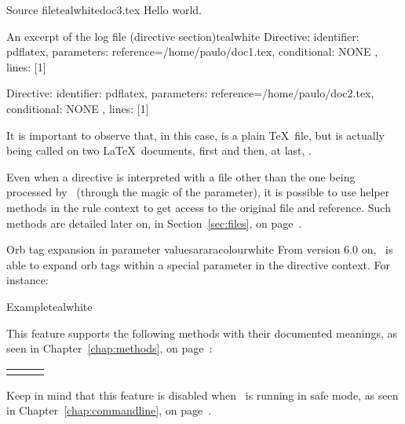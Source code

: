 \begin{ncodebox}{Source file}{teal}{\icnote}{white}{doc3.tex}
Hello world.
\bye
\end{ncodebox}

\begin{codebox}{An excerpt of the log file (directive section)}{teal}{\icnote}{white}
Directive: { identifier: pdflatex, parameters:
{reference=/home/paulo/doc1.tex},
conditional: { NONE }, lines: [1] }

Directive: { identifier: pdflatex, parameters:
{reference=/home/paulo/doc2.tex},
conditional: { NONE }, lines: [1] }
\end{codebox}

It is important to observe that, in this case,  is a plain \TeX\ file, but  is actually being called on two \LaTeX\ documents, first  and then, at last, .

Even when a directive is interpreted with a file other than the one being processed by \arara\ (through the magic of the  parameter), it is possible to use helper methods in the rule context to get access to the original file and reference. Such methods are detailed later on, in Section~\ref{sec:files}, on page~\pageref{sec:files}.

\begin{messagebox}{Orb tag expansion in parameter values}{araracolour}{\icinfo}{white}
From version 6.0 on, \arara\ is able to expand orb tags within a special  parameter in the directive context. For instance:

\begin{codebox}{Example}{teal}{\icnote}{white}
\end{codebox}

This feature supports the following methods with their documented meanings, as seen in Chapter~\ref{chap:methods}, on page~\pageref{chap:methods}:

\vspace{2ex}

\begin{tabularx}{0.95\textwidth}{YYY}
 &  & 
\end{tabularx}

\vspace{2ex}

Keep in mind that this feature is disabled when \arara\ is running in safe mode, as seen in Chapter~\ref{chap:commandline}, on page~\pageref{chap:commandline}.
\end{messagebox}

